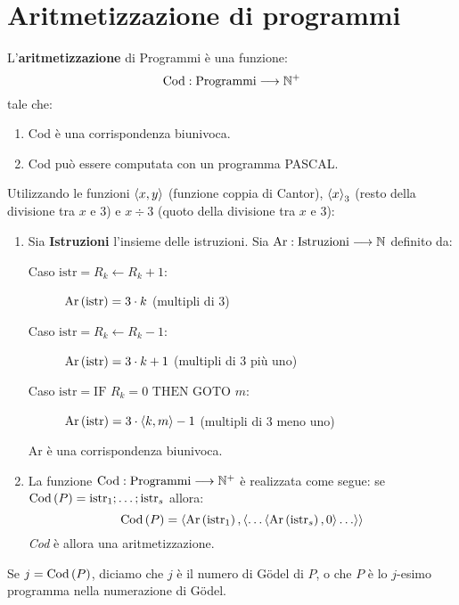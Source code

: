 \documentclass{lectures}
\begin{document}
\section{Aritmetizzazione di programmi}
\begin{definition}
    L'\textbf{aritmetizzazione} di Programmi è una funzione:
    \[
        \text{Cod}:\text{Programmi}\longrightarrow \mathbb{N}^+
    \]
    tale che:
    \begin{enumerate}
        \item Cod è una corrispondenza biunivoca.
        \item Cod può essere computata con un programma PASCAL.
    \end{enumerate}
\end{definition}
\begin{example}
    Utilizzando le funzioni \(\left\langle x,y\right\rangle\) (funzione coppia di Cantor), \(\left\langle x\right\rangle_3\) (resto della divisione tra \(x\) e \(3\)) e \(x \div 3\) (quoto della divisione tra \(x\) e \(3\)):
    \begin{enumerate}
        \item Sia \textbf{Istruzioni} l'insieme delle istruzioni. Sia \(\text{Ar}:\text{Istruzioni}\longrightarrow \mathbb{N}\) definito da:
        \begin{description}
            \item[Caso \(\text{istr}=R_k \leftarrow R_k + 1\):] \(\text{Ar}\left(\text{istr}\right) = 3\cdot k\) (multipli di 3)
            \item[Caso \(\text{istr}=R_k \leftarrow R_k - 1\):] \(\text{Ar}\left(\text{istr}\right) = 3\cdot k + 1\) (multipli di 3 più uno)
            \item[Caso \(\text{istr} = \text{IF }R_k = 0\text{ THEN GOTO }m\):]\(\text{Ar}\left(\text{istr}\right)=3\cdot \left\langle k,m\right\rangle-1\) (multipli di 3 meno uno)
        \end{description}
        Ar è una corrispondenza biunivoca.
        \item La funzione \(\text{Cod}:\text{Programmi}\longrightarrow \mathbb{N}^+\) è realizzata come segue: se \(\text{Cod}\left(P\right) = \text{istr}_1;\ldots;\text{istr}_s\) allora:
        \[
            \text{Cod}\left(P\right) = \left\langle\text{Ar}\left(\text{istr}_1\right), \left\langle\ldots\left\langle\text{Ar}\left(\text{istr}_s\right),0\right\rangle\ldots\right\rangle\right\rangle
        \]
        \textit{Cod} è allora una aritmetizzazione.
    \end{enumerate}
\end{example}
\begin{definition}
    Se \(j=\text{Cod}\left(P\right)\), diciamo che \(j\) è il numero di Gödel di \(P\), o che \(P\) è lo \(j\)-esimo programma nella numerazione di Gödel.
\end{definition}
\end{document}
